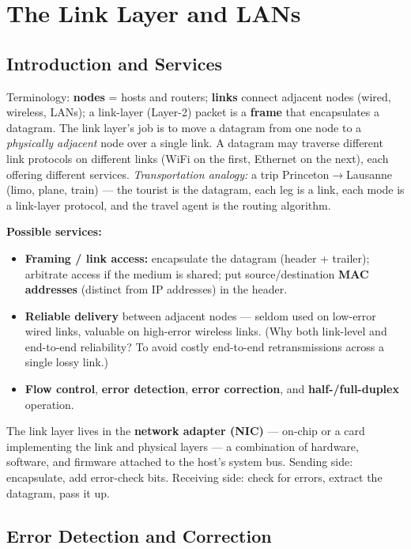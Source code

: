 \documentclass[hidelinks]{article}
\begin{document}
\section{The Link Layer and LANs}

\subsection{Introduction and Services}

Terminology: \textbf{nodes} = hosts and routers; \textbf{links} connect
adjacent nodes (wired, wireless, LANs); a link-layer (Layer-2) packet is a
\textbf{frame} that encapsulates a datagram. The link layer's job is to move a
datagram from one node to a \emph{physically adjacent} node over a single link.
A datagram may traverse different link protocols on different links (WiFi on the
first, Ethernet on the next), each offering different services.
\emph{Transportation analogy:} a trip Princeton$\to$Lausanne (limo, plane,
train) --- the tourist is the datagram, each leg is a link, each mode is a
link-layer protocol, and the travel agent is the routing algorithm.

\textbf{Possible services:}
\begin{itemize}
    \item \textbf{Framing / link access:} encapsulate the datagram (header +
    trailer); arbitrate access if the medium is shared; put source/destination
    \textbf{MAC addresses} (distinct from IP addresses) in the header.
    \item \textbf{Reliable delivery} between adjacent nodes --- seldom used on
    low-error wired links, valuable on high-error wireless links. (Why both
    link-level and end-to-end reliability? To avoid costly end-to-end
    retransmissions across a single lossy link.)
    \item \textbf{Flow control}, \textbf{error detection}, \textbf{error
    correction}, and \textbf{half-/full-duplex} operation.
\end{itemize}
The link layer lives in the \textbf{network adapter (NIC)} --- on-chip or a
card implementing the link and physical layers --- a combination of hardware,
software, and firmware attached to the host's system bus. Sending side:
encapsulate, add error-check bits. Receiving side: check for errors, extract
the datagram, pass it up.

\subsection{Error Detection and Correction}
\end{document}
